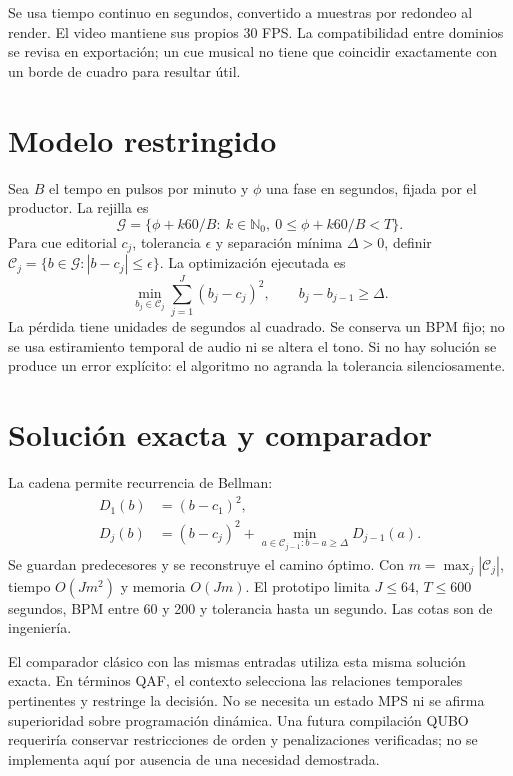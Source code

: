 \documentclass[11pt,a4paper]{article}
\begin{document}
Se usa tiempo continuo en segundos, convertido a muestras por redondeo al render. El video mantiene sus propios 30 FPS. La compatibilidad entre dominios se revisa en exportación; un cue musical no tiene que coincidir exactamente con un borde de cuadro para resultar útil.

\newpage
\section{Modelo restringido}
Sea $B$ el tempo en pulsos por minuto y $\phi$ una fase en segundos, fijada por el productor. La rejilla es
\begin{equation}
 \mathcal G=\{\phi+k60/B:\ k\in\mathbb N_0,\ 0\leq\phi+k60/B<T\}.
\end{equation}
Para cue editorial $c_j$, tolerancia $\epsilon$ y separación mínima $\Delta>0$, definir $\mathcal C_j=\{b\in\mathcal G:|b-c_j|\leq\epsilon\}$. La optimización ejecutada es
\begin{equation}
 \min_{b_j\in\mathcal C_j}\sum_{j=1}^{J}(b_j-c_j)^2,
 \qquad b_j-b_{j-1}\geq\Delta.
\end{equation}
La pérdida tiene unidades de segundos al cuadrado. Se conserva un BPM fijo; no se usa estiramiento temporal de audio ni se altera el tono. Si no hay solución se produce un error explícito: el algoritmo no agranda la tolerancia silenciosamente.
\section{Solución exacta y comparador}
La cadena permite recurrencia de Bellman:
\begin{align}
 D_1(b)&=(b-c_1)^2,\\
 D_j(b)&=(b-c_j)^2+\min_{a\in\mathcal C_{j-1}:b-a\geq\Delta}D_{j-1}(a).
\end{align}
Se guardan predecesores y se reconstruye el camino óptimo. Con $m=\max_j|\mathcal C_j|$, tiempo $O(Jm^2)$ y memoria $O(Jm)$. El prototipo limita $J\leq64$, $T\leq600$ segundos, BPM entre 60 y 200 y tolerancia hasta un segundo. Las cotas son de ingeniería.

El comparador clásico con las mismas entradas utiliza esta misma solución exacta. En términos QAF, el contexto selecciona las relaciones temporales pertinentes y restringe la decisión. No se necesita un estado MPS ni se afirma superioridad sobre programación dinámica. Una futura compilación QUBO requeriría conservar restricciones de orden y penalizaciones verificadas; no se implementa aquí por ausencia de una necesidad demostrada.
\end{document}
